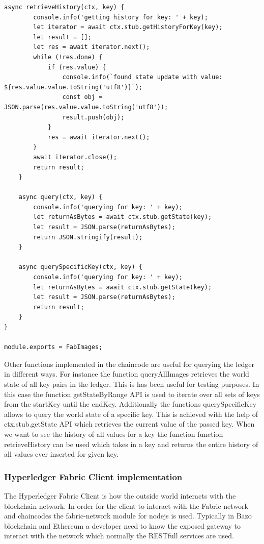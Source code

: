 \begin{lstlisting}[caption={Chaincode for interacting with the network.},label=chaincode, captionpos=b]
    async retrieveHistory(ctx, key) {
        console.info('getting history for key: ' + key);
        let iterator = await ctx.stub.getHistoryForKey(key);
        let result = [];
        let res = await iterator.next();
        while (!res.done) {
            if (res.value) {
                console.info(`found state update with value: ${res.value.value.toString('utf8')}`);
                const obj = JSON.parse(res.value.value.toString('utf8'));
                result.push(obj);
            }
            res = await iterator.next();
        }
        await iterator.close();
        return result;
    }

    async query(ctx, key) {
        console.info('querying for key: ' + key);
        let returnAsBytes = await ctx.stub.getState(key);
        let result = JSON.parse(returnAsBytes);
        return JSON.stringify(result);
    }

    async querySpecificKey(ctx, key) {
        console.info('querying for key: ' + key);
        let returnAsBytes = await ctx.stub.getState(key);
        let result = JSON.parse(returnAsBytes);
        return result;
    }
}

module.exports = FabImages;

\end{lstlisting}


Other functions implemented in the chaincode are useful for querying the ledger in different ways. For instance the function {\selectfont queryAllImages}  retrieves the world state of all key pairs in the ledger. This is has been useful for testing purposes. In this case the function {\selectfont getStateByRange} API is used to iterate over all sets of keys from the startKey until the endKey. 
Additionally the functions {\selectfont querySpecificKey} allows to query the world state of a specific key. This is achieved with the help of {\selectfont ctx.stub.getState} API which retrieves the current value of the passed key. When we want to see the history of all values for a key the function function {\selectfont retrieveHistory} can be used which takes in a key and returns the entire history of all values ever inserted for given key. 

\subsubsection{Hyperledger Fabric Client implementation}
The Hyperledger Fabric Client is how the outside world interacts with the blockchain network. In order for the client to interact with the Fabric network and chaincodes the {\selectfont fabric-network} module for nodejs is used. Typically in Bazo blockchain and Ethereum a developer need to know the exposed gateway to interact with the network which normally the RESTfull services are used. 

